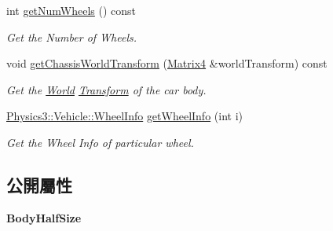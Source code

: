 \begin{DoxyCompactItemize}
int \hyperlink{class_magnum_1_1_physics3_1_1_vehicle_a01cd99b654554f600054b8ca2055c81b}{get\+Num\+Wheels} () const 
\begin{DoxyCompactList}\small\item\em Get the Number of Wheels. \end{DoxyCompactList}\item 
void \hyperlink{class_magnum_1_1_physics3_1_1_vehicle_a1fe5b6692fdf6b258e507514d2654103}{get\+Chassis\+World\+Transform} (\hyperlink{class_magnum_1_1_matrix4}{Matrix4} \&world\+Transform) const 
\begin{DoxyCompactList}\small\item\em Get the \hyperlink{class_magnum_1_1_physics3_1_1_world}{World} \hyperlink{class_magnum_1_1_transform}{Transform} of the car body. \end{DoxyCompactList}\item 
\hyperlink{class_magnum_1_1_physics3_1_1_vehicle_1_1_wheel_info}{Physics3\+::\+Vehicle\+::\+Wheel\+Info} \hyperlink{class_magnum_1_1_physics3_1_1_vehicle_af43dcaf1d8a80592d6db24ac336a2c50}{get\+Wheel\+Info} (int i)
\begin{DoxyCompactList}\small\item\em Get the Wheel Info of particular wheel. \end{DoxyCompactList}\end{DoxyCompactItemize}
\subsection*{公開屬性}
\begin{DoxyCompactItemize}
\item 
{\bfseries Body\+Half\+Size}\hypertarget{class_magnum_1_1_physics3_1_1_vehicle_ad043a297b64432c2302a5ba0d5f7f903}{}\label{class_magnum_1_1_physics3_1_1_vehicle_ad043a297b64432c2302a5ba0d5f7f903}

\end{DoxyCompactItemize}
